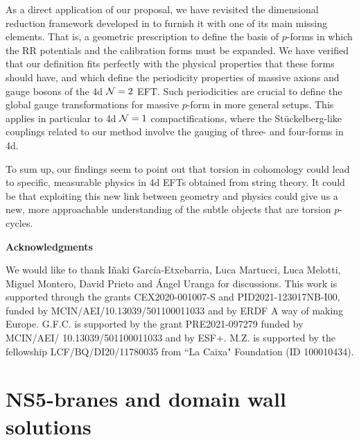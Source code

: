 \documentclass[11pt]{article}
\def\CN {{\cal N}}
\begin{document}
As a direct application of our proposal, we have revisited the dimensional reduction framework developed in \cite{Gurrieri:2002wz,DAuria:2004kwe,Grana:2005ny,Kashani-Poor:2006ofe} to furnish it with one of its main missing elements. That is, a geometric prescription to define the basis of $p$-forms in which the RR potentials and the calibration forms must be expanded. We have verified that our definition fits perfectly with the physical properties that these forms should have, and which define the periodicity properties of massive axions and gauge bosons of the 4d $\CN=2$ EFT. Such periodicities are crucial to define the global gauge transformations for massive $p$-form in more general setups. This applies in particular to  4d $\CN=1$ compactifications, where the St\"uckelberg-like couplings related to our method involve the gauging of three- and four-forms in 4d. 

To sum up, our findings seem to point out that torsion in cohomology could lead to specific, measurable physics in 4d EFTs obtained from string theory. It could be that exploiting this new link between geometry and physics could give us a new, more approachable understanding of the subtle objects that are torsion $p$-cycles. 




\bigskip


\centerline{\bf  Acknowledgments}

\vspace*{.5cm}

We would like to thank I\~naki Garc\'ia-Etxebarria, Luca Martucci, Luca Melotti, Miguel Montero, David Prieto and \'Angel Uranga for discussions.  This work is supported through the grants CEX2020-001007-S and PID2021-123017NB-I00, funded by MCIN/AEI/10.13039/501100011033 and by ERDF A way of making Europe. G.F.C. is supported by the grant PRE2021-097279 funded by MCIN/AEI/ 10.13039/501100011033 and by ESF+. M.Z. is supported by the fellowship LCF/BQ/DI20/11780035 from ``La Caixa" Foundation (ID 100010434).




\appendix


\section{NS5-branes and domain wall solutions}
\label{ap:NS5DW}
\end{document}
